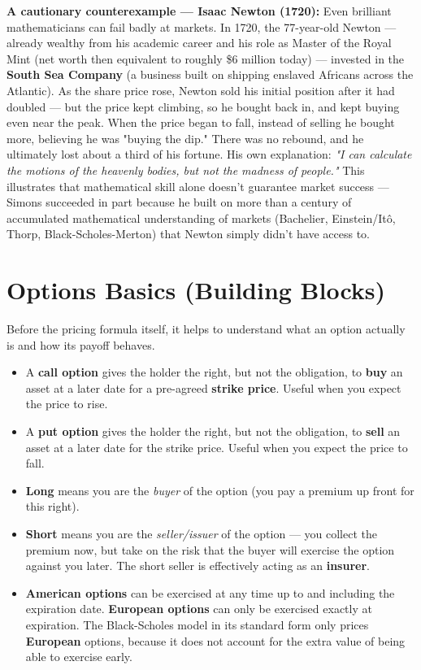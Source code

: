\documentclass[12pt,openany]{book}
\theoremstyle{definition}
\theoremstyle{remark}
\begin{document}
\textbf{A cautionary counterexample --- Isaac Newton (1720):} Even brilliant mathematicians can fail badly at markets. In 1720, the 77-year-old Newton --- already wealthy from his academic career and his role as Master of the Royal Mint (net worth then equivalent to roughly \$6 million today) --- invested in the \textbf{South Sea Company} (a business built on shipping enslaved Africans across the Atlantic). As the share price rose, Newton sold his initial position after it had doubled --- but the price kept climbing, so he bought back in, and kept buying even near the peak. When the price began to fall, instead of selling he bought more, believing he was "buying the dip." There was no rebound, and he ultimately lost about a third of his fortune. His own explanation: \emph{"I can calculate the motions of the heavenly bodies, but not the madness of people."} This illustrates that mathematical skill alone doesn't guarantee market success --- Simons succeeded in part because he built on more than a century of accumulated mathematical understanding of markets (Bachelier, Einstein/Itô, Thorp, Black-Scholes-Merton) that Newton simply didn't have access to.

\section{Options Basics (Building Blocks)}

Before the pricing formula itself, it helps to understand what an option actually is and how its payoff behaves.

\begin{itemize}
\item A \textbf{call option} gives the holder the right, but not the obligation, to \textbf{buy} an asset at a later date for a pre-agreed \textbf{strike price}. Useful when you expect the price to rise.


\item A \textbf{put option} gives the holder the right, but not the obligation, to \textbf{sell} an asset at a later date for the strike price. Useful when you expect the price to fall.


\item \textbf{Long} means you are the \emph{buyer} of the option (you pay a premium up front for this right).


\item \textbf{Short} means you are the \emph{seller/issuer} of the option --- you collect the premium now, but take on the risk that the buyer will exercise the option against you later. The short seller is effectively acting as an \textbf{insurer}.


\item \textbf{American options} can be exercised at any time up to and including the expiration date. \textbf{European options} can only be exercised exactly at expiration. The Black-Scholes model in its standard form only prices \textbf{European} options, because it does not account for the extra value of being able to exercise early.


\end{itemize}
\end{document}
